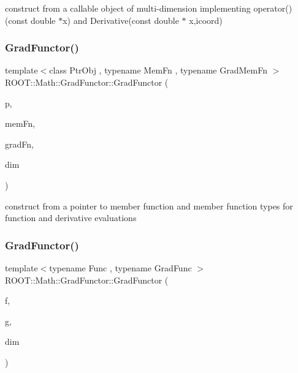 construct from a callable object of multi-\/dimension implementing operator()(const double $\ast$x) and Derivative(const double $\ast$ x,icoord) \mbox{\label{classROOT_1_1Math_1_1GradFunctor_af7c06950b37bea8844b81f53b0bf41df}} 
\subsubsection{\texorpdfstring{GradFunctor()}{GradFunctor()}\hspace{0.1cm}{\footnotesize\ttfamily [13/15]}}
{\footnotesize\ttfamily template$<$class Ptr\+Obj , typename Mem\+Fn , typename Grad\+Mem\+Fn $>$ \\
R\+O\+O\+T\+::\+Math\+::\+Grad\+Functor\+::\+Grad\+Functor (\begin{DoxyParamCaption}\item[{const Ptr\+Obj \&}]{p,  }\item[{Mem\+Fn}]{mem\+Fn,  }\item[{Grad\+Mem\+Fn}]{grad\+Fn,  }\item[{unsigned int}]{dim }\end{DoxyParamCaption})\hspace{0.3cm}{\ttfamily [inline]}}

construct from a pointer to member function and member function types for function and derivative evaluations \mbox{\label{classROOT_1_1Math_1_1GradFunctor_a079a63821986eb0ce6e011c366c1cb9a}} 
\subsubsection{\texorpdfstring{GradFunctor()}{GradFunctor()}\hspace{0.1cm}{\footnotesize\ttfamily [14/15]}}
{\footnotesize\ttfamily template$<$typename Func , typename Grad\+Func $>$ \\
R\+O\+O\+T\+::\+Math\+::\+Grad\+Functor\+::\+Grad\+Functor (\begin{DoxyParamCaption}\item[{const Func \&}]{f,  }\item[{const Grad\+Func \&}]{g,  }\item[{int}]{dim }\end{DoxyParamCaption})\hspace{0.3cm}{\ttfamily [inline]}}

